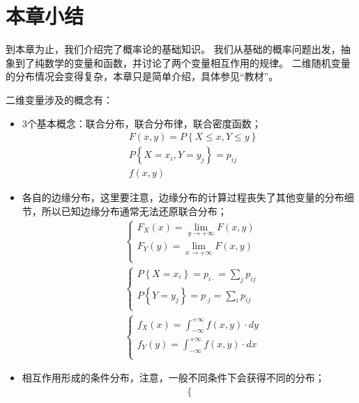\section{本章小结}

到本章为止，我们介绍完了概率论的基础知识。
我们从基础的概率问题出发，抽象到了纯数学的变量和函数，并讨论了两个变量相互作用的规律。
二维随机变量的分布情况会变得复杂，本章只是简单介绍，具体参见“教材\cite{book1,book2}”。

二维变量涉及的概念有：
\begin{itemize}
    \item 3个基本概念：联合分布，联合分布律，联合密度函数；
    \begin{align*}
    &F\left( x,y \right) =P\left\{ X\leqslant x,Y\leqslant y \right\} \\
    &P\left\{ X=x_i,Y=y_j \right\} =p_{ij} \\
    &f\left( x,y \right)
    \end{align*}
    \item 各自的边缘分布，这里要注意，边缘分布的计算过程丧失了其他变量的分布细节，所以已知边缘分布通常无法还原联合分布；
    \begin{align*}
    &\begin{cases}
	    F_X\left( x \right) =\underset{y\rightarrow +\infty}{\lim}F\left( x,y \right)\\
	    F_Y\left( y \right) =\underset{x\rightarrow +\infty}{\lim}F\left( x,y \right)\\
    \end{cases} \\
    &\begin{cases}
	    P\left\{ X=x_i \right\} =p_{i\cdot}=\sum_j{p_{ij}}\\
	    P\left\{ Y=y_j \right\} =p_{\cdot j}=\sum_i{p_{ij}}\\
    \end{cases} \\
    &\begin{cases}
    	f_X\left( x \right) =\int_{-\infty}^{+\infty}{f\left( x,y \right) \cdot dy}\\
    	f_Y\left( y \right) =\int_{-\infty}^{+\infty}{f\left( x,y \right) \cdot dx}\\
    \end{cases}
    \end{align*}
    \item 相互作用形成的条件分布，注意，一般不同条件下会获得不同的分布；
    \begin{align*}
    &\begin{cases}

\end{cases}
\end{align*}
\end{itemize}
